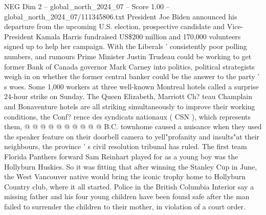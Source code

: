 \begin{textsample}{NEG Dim 2 – global\_north\_2024\_07 – Score 1.00 – global\_north\_2024\_07/111345806.txt}
President Joe Biden announced his departure from the upcoming U.S. election, prospective candidate and Vice-President Kamala Harris fundraised US\$200 million and 170,000 volunteers signed up to help her campaign.
With the Liberals ' consistently poor polling numbers, and rumours Prime Minister Justin Trudeau could be working to get former Bank of Canada governor Mark Carney into politics, political strategists weigh in on whether the former central banker could be the answer to the party ' s woes.
Some 1,000 workers at three well-known Montreal hotels called a surprise 24-hour strike on Sunday.
The Queen Elizabeth, Marriott Ch? teau Champlain and Bonaventure hotels are all striking simultaneously to improve their working conditions, the Conf? rence des syndicats nationaux ( CSN ), which represents them, @ @ @ @ @ @ @ @ @ @ B.C. townhome caused a nuisance when they used the speaker feature on their doorbell camera to yell"profanity and insults"at their neighbours, the province ' s civil resolution tribunal has ruled.
The first team Florida Panthers forward Sam Reinhart played for as a young boy was the Hollyburn Huskies.
So it was fitting that after winning the Stanley Cup in June, the West Vancouver native would bring the iconic trophy home to Hollyburn Country club, where it all started.
Police in the British Columbia Interior say a missing father and his four young children have been found safe after the man failed to surrender the children to their mother, in violation of a court order.

\end{textsample}
